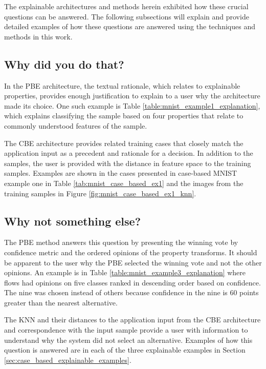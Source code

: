 The explainable architectures and methods herein exhibited how these crucial
questions can be answered. The following subsections will explain and provide
detailed examples of how these questions are answered using the techniques and
methods in this work.

\subsection{Why did you do that?}

In the PBE architecture, the textual rationale, which relates to explainable
properties, provides enough justification to explain to a user why the
architecture made its choice. One such example is Table
\ref{table:mnist_example1_explanation}, which explains classifying the sample
based on four properties that relate to commonly understood features of the
sample.

The CBE architecture provides related training cases that closely match the
application input as a precedent and rationale for a decision. In addition to
the samples, the user is provided with the distance in feature space to the
training samples. Examples are shown in the cases presented in case-based MNIST
example one in Table \ref{tab:mnist_case_based_ex1} and the images from the
training samples in Figure \ref{fig:mnist_case_based_ex1_knn}.

\subsection{Why not something else?}

The PBE method answers this question by presenting the winning vote by
confidence metric and the ordered opinions of the property transforms. It should
be apparent to the user why the PBE selected the winning vote and not the other
opinions. An example is in Table \ref{table:mnist_example3_explanation} where
flows had opinions on five classes ranked in descending order based on
confidence. The nine was chosen instead of others because confidence in the nine
is 60 points greater than the nearest alternative. 

The KNN and their distances to the application input from the CBE architecture
and correspondence with the input sample provide a user with information to
understand why the system did not select an alternative. Examples of how this
question is answered are in each of the three explainable examples in Section
\ref{sec:case_based_explainable_examples}.

